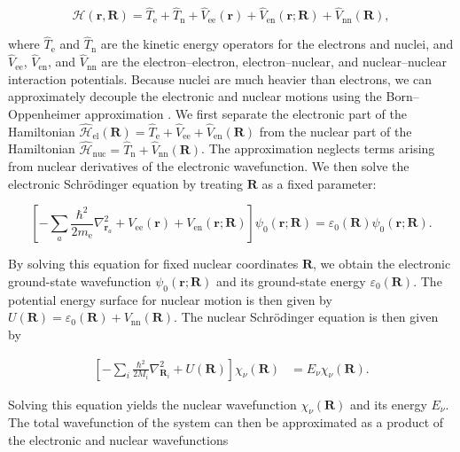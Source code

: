 \documentclass[12pt,a4paper]{article}
\numberwithin{equation}{section}
\begin{document}
\begin{equation}
  \hat{\mathcal H}(\bm r,\bm R)
    =\hat T_{\mathrm e}+\hat T_{\mathrm n}+\hat V_{\mathrm{ee}}(\bm r)
      +\hat V_{\mathrm{en}}(\bm r;\bm R)+\hat V_{\mathrm{nn}}(\bm R),
  \label{eq:full-hamiltonian}
\end{equation}

where $\hat T_{\mathrm e}$ and $\hat T_{\mathrm n}$ are the kinetic energy operators for the electrons and nuclei,
and $\hat V_{\mathrm{ee}}$, $\hat V_{\mathrm{en}}$, and $\hat V_{\mathrm{nn}}$ are the electron--electron,
electron--nuclear, and nuclear--nuclear interaction potentials.
Because nuclei are much heavier than electrons,
we can approximately decouple the electronic and nuclear motions using the Born--Oppenheimer approximation \cite{born1927}.
We first separate the electronic part of the Hamiltonian
$\hat{\mathcal H}_{\mathrm{el}}(\bm R)=\hat T_{\mathrm e}+\hat V_{\mathrm{ee}}+\hat V_{\mathrm{en}}(\bm R)$
from the nuclear part of the Hamiltonian $\hat{\mathcal H}_{\mathrm{nuc}}=\hat T_{\mathrm n}+\hat V_{\mathrm{nn}}(\bm R)$.
The approximation neglects terms arising from nuclear derivatives of the electronic wavefunction.
We then solve the electronic Schrödinger equation by treating $\bm R$ as a fixed parameter:

\begin{equation}
  \left[-\sum_a\frac{\hbar^2}{2m_{\mathrm e}}\nabla_{\bm r_a}^2
         +V_{\mathrm{ee}}(\bm r)+V_{\mathrm{en}}(\bm r;\bm R)\right]
       \psi_0(\bm r;\bm R)
    =\varepsilon_0(\bm R)\psi_0(\bm r;\bm R).
  \label{eq:bo-electronic-schrodinger}
\end{equation}

By solving this equation for fixed nuclear coordinates $\bm R$,
we obtain the electronic ground-state wavefunction $\psi_0(\bm r;\bm R)$ and its ground-state energy $\varepsilon_0(\bm R)$.
The potential energy surface for nuclear motion is then given by
$U(\bm R)=\varepsilon_0(\bm R)+V_{\mathrm{nn}}(\bm R)$.
The nuclear Schrödinger equation is then given by

\begin{align}
  \left[-\sum_i\frac{\hbar^2}{2M_i}\nabla_{\bm R_i}^2+U(\bm R)\right]
       \chi_\nu(\bm R)
    &=E_\nu\chi_\nu(\bm R).
    \label{eq:bo-nuclear-schrödinger}
\end{align}

Solving this equation yields the nuclear wavefunction $\chi_\nu(\bm R)$ and its energy $E_\nu$.
The total wavefunction of the system can then be approximated as a product of the electronic and nuclear wavefunctions
\end{document}

